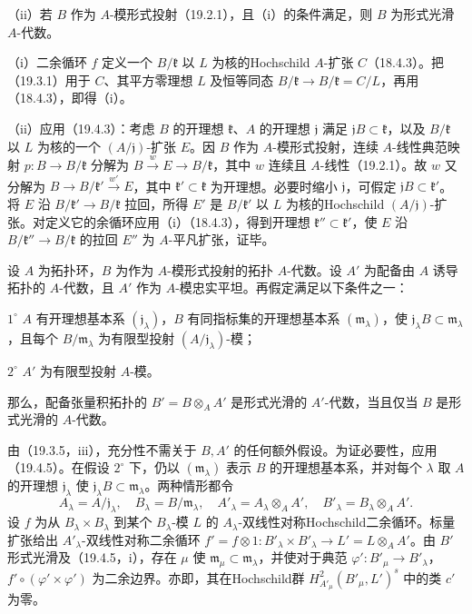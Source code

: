 （ii）若 $B$ 作为 $A$-模形式投射（19.2.1），且（i）的条件满足，则 $B$ 为形式光滑 $A$-代数。

（i）二余循环 $f$ 定义一个 $B/\mathfrak k$ 以 $L$ 为核的Hochschild $A$-扩张 $C$（18.4.3）。把（19.3.1）用于 $C$、其平方零理想 $L$ 及恒等同态 $B/\mathfrak k\to B/\mathfrak k=C/L$，再用（18.4.3），即得（i）。

（ii）应用（19.4.3）：考虑 $B$ 的开理想 $\mathfrak k$、$A$ 的开理想 $\mathfrak j$ 满足 $\mathfrak jB\subset\mathfrak k$，以及 $B/\mathfrak k$ 以 $L$ 为核的一个 $(A/\mathfrak j)$-扩张 $E$。因 $B$ 作为 $A$-模形式投射，连续 $A$-线性典范映射 $p:B\to B/\mathfrak k$ 分解为 $B\xrightarrow{w}E\to B/\mathfrak k$，其中 $w$ 连续且 $A$-线性（19.2.1）。故 $w$ 又分解为 $B\to B/\mathfrak k'\xrightarrow{w'}E$，其中 $\mathfrak k'\subset\mathfrak k$ 为开理想。必要时缩小 $\mathfrak j$，可假定 $\mathfrak jB\subset\mathfrak k'$。将 $E$ 沿 $B/\mathfrak k'\to B/\mathfrak k$ 拉回，所得 $E'$ 是 $B/\mathfrak k'$ 以 $L$ 为核的Hochschild $(A/\mathfrak j)$-扩张。对定义它的余循环应用（i）（18.4.3），得到开理想 $\mathfrak k''\subset\mathfrak k'$，使 $E$ 沿 $B/\mathfrak k''\to B/\mathfrak k$ 的拉回 $E''$ 为 $A$-平凡扩张，证毕。

设 $A$ 为拓扑环，$B$ 为作为 $A$-模形式投射的拓扑 $A$-代数。设 $A'$ 为配备由 $A$ 诱导拓扑的 $A$-代数，且 $A'$ 作为 $A$-模忠实平坦。再假定满足以下条件之一：

$1^\circ$ $A$ 有开理想基本系 $(\mathfrak j_\lambda)$，$B$ 有同指标集的开理想基本系 $(\mathfrak m_\lambda)$，使 $\mathfrak j_\lambda B\subset\mathfrak m_\lambda$，且每个 $B/\mathfrak m_\lambda$ 为有限型投射 $(A/\mathfrak j_\lambda)$-模；

$2^\circ$ $A'$ 为有限型投射 $A$-模。

那么，配备张量积拓扑的 $B'=B\otimes_AA'$ 是形式光滑的 $A'$-代数，当且仅当 $B$ 是形式光滑的 $A$-代数。

由（19.3.5，iii），充分性不需关于 $B,A'$ 的任何额外假设。为证必要性，应用（19.4.5）。在假设 $2^\circ$ 下，仍以 $(\mathfrak m_\lambda)$ 表示 $B$ 的开理想基本系，并对每个 $\lambda$ 取 $A$ 的开理想 $\mathfrak j_\lambda$ 使 $\mathfrak j_\lambda B\subset\mathfrak m_\lambda$。两种情形都令
\[
 A_\lambda=A/\mathfrak j_\lambda,\quad
 B_\lambda=B/\mathfrak m_\lambda,\quad
 A'_\lambda=A_\lambda\otimes_AA',\quad
 B'_\lambda=B_\lambda\otimes_AA'.
\]
设 $f$ 为从 $B_\lambda\times B_\lambda$ 到某个 $B_\lambda$-模 $L$ 的 $A_\lambda$-双线性对称Hochschild二余循环。标量扩张给出 $A'_\lambda$-双线性对称二余循环 $f'=f\otimes1:B'_\lambda\times B'_\lambda\to L'=L\otimes_AA'$。由 $B'$ 形式光滑及（19.4.5，i），存在 $\mu$ 使 $\mathfrak m_\mu\subset\mathfrak m_\lambda$，并使对于典范 $\varphi':B'_\mu\to B'_\lambda$，$f'\circ(\varphi'\times\varphi')$ 为二余边界。亦即，其在Hochschild群 $H^2_{A'_\mu}(B'_\mu,L')^s$ 中的类 $c'$ 为零。

